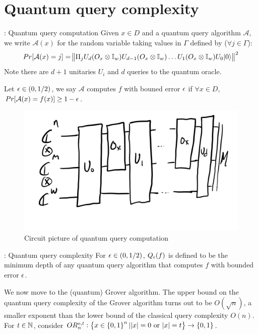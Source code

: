 \section{Quantum query complexity}
\begin{defbox}{: Quantum query computation}
    Given $x \in D$ and a quantum query algorithm $\mathcal{A}$, we write $\mathcal{A}(x)$ for the random variable taking values in $\Gamma$ defined by ($\forall j \in \Gamma$):
    \begin{equation}
        Pr[\mathcal{A}(x) = j] = \norm{\Pi_j U_d(O_x \otimes \mathbb{I}_w)U_{d-1}(O_x \otimes \mathbb{I}_w)\ldots U_1(O_x \otimes \mathbb{I}_w)U_0\lvert 0 \rangle}^2
    \end{equation}
    Note there are $d+1$ unitaries $U_i$ and $d$ queries to the quantum oracle.

    Let $\epsilon \in (0, 1/2)$, we say $\mathcal{A}$ computes $f$ with bouned error $\epsilon$ if $\forall x \in D$, $Pr[\mathcal{A}(x) = f(x)] \geq 1 - \epsilon$.
\end{defbox}

\begin{figure}[htbp!]
    \centering
    \includegraphics[scale=0.5]{Images/fig-lec3-quantumquerycomp.png}
    \caption{Circuit picture of quantum query computation}
    \label{lec3-quantumquerycomp}
\end{figure}

\begin{defbox}{: Quantum query complexity}
    For $\epsilon \in (0, 1/2)$, $Q_\epsilon(f)$ is defined to be the minimum depth of any quantum query algorithm that computes $f$ with bounded error $\epsilon$. 
\end{defbox}

We now move to the (quantum) Grover algorithm. The upper bound on the quantum query complexity of the Grover algorithm turns out to be $O(\sqrt{n})$, a smaller exponent than the lower bound of the classical query complexity $O(n)$. For $t \in \mathbb{N}$, consider $OR_n^{o, t}: \set{x \in \set{0, 1}^n \vert \lvert x \rvert = 0 \text{ or } \lvert x \rvert = t} \to \set{0, 1}$. 


